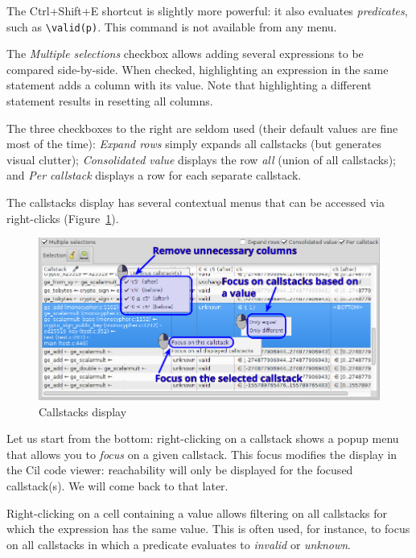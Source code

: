 The Ctrl+Shift+E shortcut is slightly more powerful: it also evaluates
\emph{predicates}, such as \texttt{\textbackslash{}valid(p)}.
This command is not available from any menu.

The \emph{Multiple selections} checkbox allows adding several
expressions to be compared side-by-side. When checked, highlighting an
expression in the same statement adds a column with its value. Note that
highlighting a different statement results in resetting all columns.

The three checkboxes to the right are seldom used (their default values
are fine most of the time): \emph{Expand rows}
simply expands all callstacks (but generates visual clutter);
\emph{Consolidated value} displays the row \emph{all} (union of all
callstacks); and \emph{Per callstack} displays a row for each separate
callstack.

The callstacks display has several contextual menus that can be accessed
via right-clicks (Figure~\ref{fig:callstacks}).

\begin{figure}[hbtp]
\centering
\includegraphics[width=\textwidth]{gui-images/gui-callstacks-annotated.png}
\caption{Callstacks display}
\label{fig:callstacks}
\end{figure}

Let us start from the bottom: right-clicking on a callstack shows a
popup menu that allows you to \emph{focus} on a given callstack. This
focus modifies the display in the Cil code viewer: reachability will
only be displayed for the focused callstack(s). We will come back to
that later.

Right-clicking on a cell containing a value allows filtering on all
callstacks for which the expression has the same value. This is often
used, for instance, to focus on all callstacks in which a predicate
evaluates to \emph{invalid} or \emph{unknown}.


